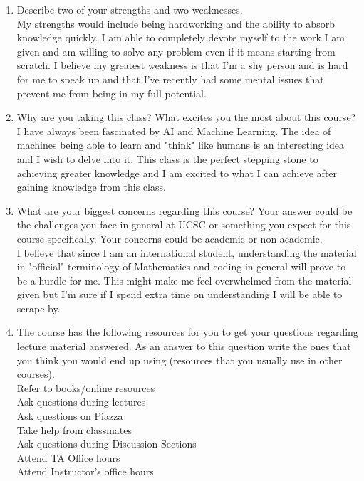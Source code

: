 \documentclass{article}
\begin{document}
\begin{enumerate}
\item Describe two of your strengths and two weaknesses.\\

My strengths would include being hardworking and the ability to absorb knowledge quickly. I am able to completely devote myself to the work I am given and am willing to solve any problem even if it means starting from scratch. I believe my greatest weakness is that I'm a shy person and is hard for me to speak up and that I've recently had some mental issues that prevent me from being in my full potential.

\item Why are you taking this class? What excites you the most about this course?\\

I have always been fascinated by AI and Machine Learning. The idea of machines being able to learn and "think" like humans is an interesting idea and I wish to delve into it. This class is the perfect stepping stone to achieving greater knowledge and I am excited to what I can achieve after gaining knowledge from this class.

\item What are your biggest concerns regarding this course? Your answer could be the challenges you face in general at UCSC or something you expect for this course specifically. Your concerns could be academic or non-academic.\\

I believe that since I am an international student, understanding the material in "official" terminology of Mathematics and coding in general will prove to be a hurdle for me. This might make me feel overwhelmed from the material given but I'm sure if I spend extra time on understanding I will be able to scrape by.

\item The course has the following resources for you to get your questions regarding lecture material answered. As an answer to this question write the ones that you think you would end up using (resources that you usually use in other courses). \\
Refer to books/online resources  \checkmark\\
Ask questions during lectures\\
Ask questions on Piazza  \checkmark\\
Take help from classmates \checkmark\\
Ask questions during Discussion Sections  \checkmark\\
Attend TA Office hours  \checkmark\\
Attend Instructor's office hours \checkmark\\


\end{enumerate}
\end{document}

